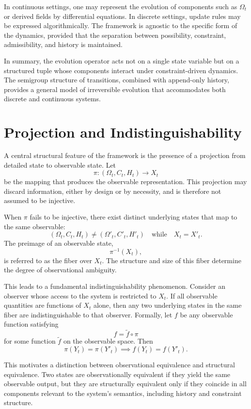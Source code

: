\documentclass[11pt,oneside]{article}
\begin{document}
In continuous settings, one may represent the evolution of components such as \( \Omega_t \) or derived fields by differential equations. In discrete settings, update rules may be expressed algorithmically. The framework is agnostic to the specific form of the dynamics, provided that the separation between possibility, constraint, admissibility, and history is maintained.

In summary, the evolution operator acts not on a single state variable but on a structured tuple whose components interact under constraint-driven dynamics. The semigroup structure of transitions, combined with append-only history, provides a general model of irreversible evolution that accommodates both discrete and continuous systems.

\section{Projection and Indistinguishability}

A central structural feature of the framework is the presence of a projection from detailed state to observable state. Let
\[
\pi : (\Omega_t, C_t, H_t) \to X_t
\]
be the mapping that produces the observable representation. This projection may discard information, either by design or by necessity, and is therefore not assumed to be injective.

When \( \pi \) fails to be injective, there exist distinct underlying states that map to the same observable:
\[
(\Omega_t, C_t, H_t) \neq (\Omega'_t, C'_t, H'_t) \quad \text{while} \quad X_t = X'_t.
\]
The preimage of an observable state,
\[
\pi^{-1}(X_t),
\]
is referred to as the fiber over \( X_t \). The structure and size of this fiber determine the degree of observational ambiguity.

This leads to a fundamental indistinguishability phenomenon. Consider an observer whose access to the system is restricted to \( X_t \). If all observable quantities are functions of \( X_t \) alone, then any two underlying states in the same fiber are indistinguishable to that observer. Formally, let \( f \) be any observable function satisfying
\[
f = \tilde{f} \circ \pi
\]
for some function \( \tilde{f} \) on the observable space. Then
\[
\pi(Y_t) = \pi(Y'_t) \implies f(Y_t) = f(Y'_t).
\]

This motivates a distinction between observational equivalence and structural equivalence. Two states are observationally equivalent if they yield the same observable output, but they are structurally equivalent only if they coincide in all components relevant to the system’s semantics, including history and constraint structure.
\end{document}
